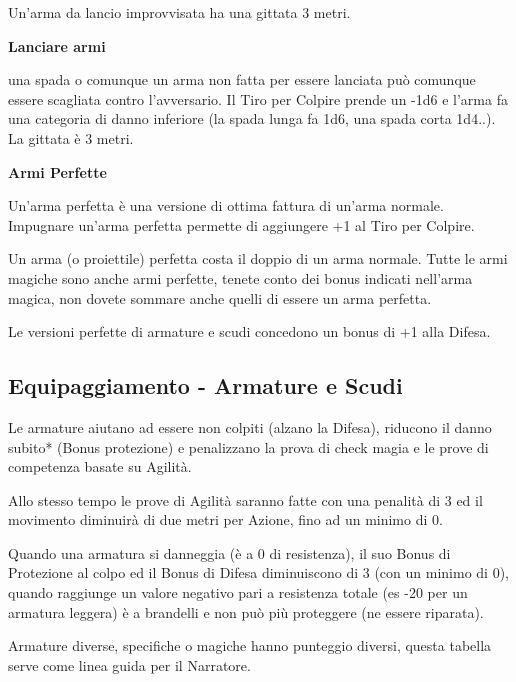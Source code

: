 \documentclass[a4paper,11pt,twoside,openany]{book}
\begin{document}
{Un'arma da lancio improvvisata ha una gittata 3 metri.

\medskip

\textbf{Lanciare armi}
	
una spada o comunque un arma non fatta per essere lanciata può comunque essere scagliata contro l'avversario. Il Tiro per Colpire prende un -1d6 e l'arma fa una categoria di danno inferiore (la spada lunga fa 1d6, una spada corta 1d4..). La gittata è 3 metri.

\medskip

\textbf{Armi Perfette}
	
Un'arma perfetta è una versione di ottima fattura di un'arma normale.
Impugnare un'arma perfetta permette di aggiungere +1 al Tiro per Colpire.
	
Un arma (o proiettile) perfetta costa il doppio di un arma normale. 
Tutte le armi magiche sono anche armi perfette, tenete conto dei bonus 	indicati nell'arma magica, non dovete sommare anche quelli di essere un arma perfetta.
		
Le versioni perfette di armature e scudi concedono un bonus di +1 alla Difesa.



\pagebreak

\subsection{Equipaggiamento - Armature e Scudi}

\label{equipaggiamento---armature-e-scudi}

Le armature aiutano ad essere non colpiti (alzano la Difesa), riducono il danno subito{*} (Bonus protezione) e penalizzano la prova di check magia e le prove di competenza basate su Agilità.

Allo stesso tempo le prove di Agilità saranno fatte con una penalità di 3 ed il movimento diminuirà di due metri per Azione, fino ad un minimo di 0.

Quando una armatura si danneggia (è a 0 di resistenza), il suo Bonus di Protezione al colpo ed il Bonus di Difesa diminuiscono di 3 (con un minimo di 0), quando raggiunge un valore negativo pari a resistenza totale (es -20 per un armatura leggera) è a brandelli e non può più proteggere (ne essere riparata).

Armature diverse, specifiche o magiche hanno punteggio diversi, questa tabella serve come linea guida per il Narratore.

}
\end{document}
